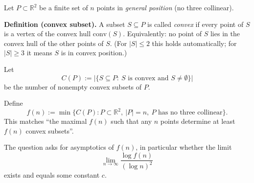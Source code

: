 Let $P\subset\mathbb R^2$ be a finite set of $n$ points in \emph{general position} (no three collinear).

\textbf{Definition (convex subset).}
A subset $S\subseteq P$ is called \emph{convex} if every point of $S$ is a vertex of the convex hull $\mathrm{conv}(S)$.
Equivalently: no point of $S$ lies in the convex hull of the other points of $S$.
(For $|S|\le 2$ this holds automatically; for $|S|\ge 3$ it means $S$ is in convex position.)

Let
\[
C(P):=\big|\{S\subseteq P:\ S\text{ is convex and }S\neq\emptyset\}\big|
\]
be the number of nonempty convex subsets of $P$.

Define
\[
f(n):=\min\{C(P): P\subset\mathbb R^2,\ |P|=n,\ P\text{ has no three collinear}\}.
\]
This matches ``the maximal $f(n)$ such that any $n$ points determine at least $f(n)$ convex subsets''.

The question asks for asymptotics of $f(n)$, in particular whether the limit
\[
\lim_{n\to\infty}\frac{\log f(n)}{(\log n)^2}
\]
exists and equals some constant $c$.
